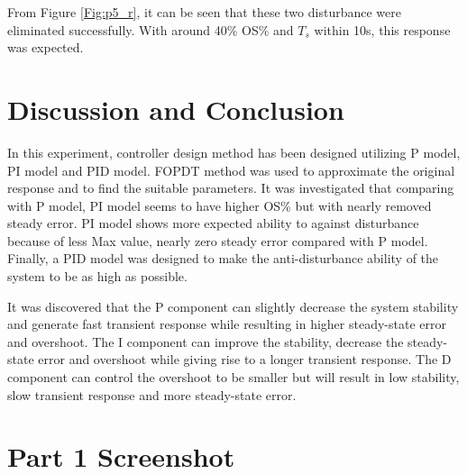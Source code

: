 \documentclass[11pt, a4paper]{article}
\begin{document}
From Figure \ref{Fig:p5_r}, it can be seen that these two disturbance were eliminated successfully. With around 40\% OS\% and $T_{s}$ within 10s, this response was expected.

\section{Discussion and Conclusion}

In this experiment, controller design method has been designed utilizing P model, PI model and PID model. FOPDT method was used to approximate the original response and to find the suitable parameters. It was investigated that comparing with P model, PI model seems to have higher OS\% but with nearly removed steady error. PI model shows more expected ability to against disturbance because of less Max value, nearly zero steady error compared with P model. Finally, a PID model was designed to make the anti-disturbance ability of the system to be as high as possible.

It was discovered that the P component can slightly decrease the system stability and generate fast transient response while resulting in higher steady-state error and overshoot. The I component can improve the stability, decrease the steady-state error and overshoot while giving rise to a longer transient response. The D component can control the overshoot to be smaller but will result in low stability, slow transient response and more steady-state error.








\newpage
\appendix
\appendixpage
\addappheadtotoc

\section{Part 1 Screenshot}
\end{document}
